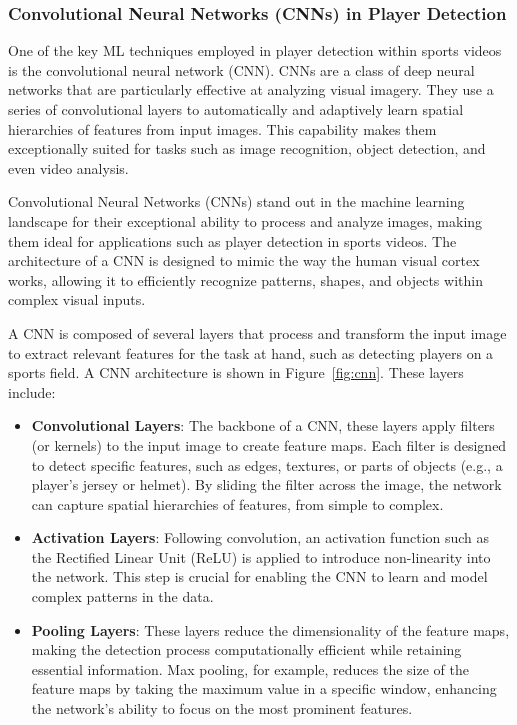 \documentclass[12pt, letterpaper]{article}
\begin{document}
{\begin{spacing}{1.2}
\subsubsection{Convolutional Neural Networks (CNNs) in Player Detection}
One of the key ML techniques employed in player detection within sports videos is the convolutional neural network (CNN). CNNs are a class of deep neural networks that are particularly effective at analyzing visual imagery. They use a series of convolutional layers to automatically and adaptively learn spatial hierarchies of features from input images. This capability makes them exceptionally suited for tasks such as image recognition, object detection, and even video analysis.

Convolutional Neural Networks (CNNs) stand out in the machine learning landscape for their exceptional ability to process and analyze images, making them ideal for applications such as player detection in sports videos. The architecture of a CNN is designed to mimic the way the human visual cortex works, allowing it to efficiently recognize patterns, shapes, and objects within complex visual inputs.

A CNN is composed of several layers that process and transform the input image to extract relevant features for the task at hand, such as detecting players on a sports field. A CNN architecture is shown in Figure~\ref{fig:cnn}. These layers include:

\begin{itemize}
    \item \textbf{Convolutional Layers}: The backbone of a CNN, these layers apply filters (or kernels) to the input image to create feature maps. Each filter is designed to detect specific features, such as edges, textures, or parts of objects (e.g., a player's jersey or helmet). By sliding the filter across the image, the network can capture spatial hierarchies of features, from simple to complex.

    \item \textbf{Activation Layers}: Following convolution, an activation function such as the Rectified Linear Unit (ReLU) is applied to introduce non-linearity into the network. This step is crucial for enabling the CNN to learn and model complex patterns in the data.

    \item \textbf{Pooling Layers}: These layers reduce the dimensionality of the feature maps, making the detection process computationally efficient while retaining essential information. Max pooling, for example, reduces the size of the feature maps by taking the maximum value in a specific window, enhancing the network's ability to focus on the most prominent features.


\end{itemize}
\end{spacing}}
\end{document}

